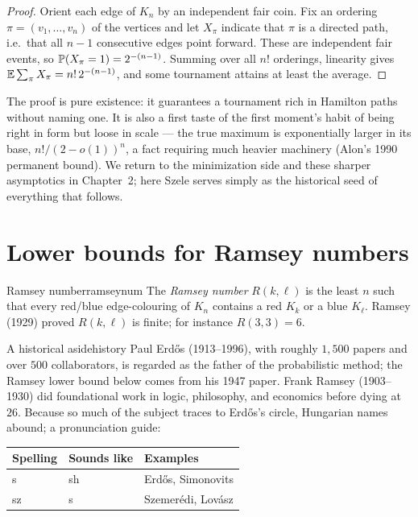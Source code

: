 \begin{proof}
Orient each edge of $K_n$ by an independent fair coin. Fix an ordering
$\pi=(v_1,\dots,v_n)$ of the vertices and let $X_\pi$ indicate that $\pi$ is a
directed path, i.e.\ that all $n-1$ consecutive edges point forward. These are
independent fair events, so $\mathbb{P}(X_\pi=1)=2^{-(n-1)}$. Summing over all $n!$
orderings, linearity gives $\mathbb{E}\sum_\pi X_\pi=n!\,2^{-(n-1)}$, and some
tournament attains at least the average.
\end{proof}

\begin{insight}
The proof is pure existence: it guarantees a tournament rich in Hamilton paths
without naming one. It is also a first taste of the first moment's habit of
being right in form but loose in scale --- the true maximum is exponentially
larger in its base, $n!/(2-o(1))^n$, a fact requiring much heavier machinery
(Alon's 1990 permanent bound). We return to the minimization side and these
sharper asymptotics in Chapter~2; here Szele serves simply as the historical
seed of everything that follows.
\end{insight}

\section{Lower bounds for Ramsey numbers}

\begin{definition}{Ramsey number}{ramseynum}
The \emph{Ramsey number} $R(k,\ell)$ is the least $n$ such that every red/blue
edge-colouring of $K_n$ contains a red $K_k$ or a blue $K_\ell$. Ramsey (1929)
proved $R(k,\ell)$ is finite; for instance $R(3,3)=6$.
\end{definition}

\begin{remark}{A historical aside}{history}
Paul Erd\H{o}s (1913--1996), with roughly $1{,}500$ papers and over $500$
collaborators, is regarded as the father of the probabilistic method; the
Ramsey lower bound below comes from his 1947 paper. Frank Ramsey (1903--1930)
did foundational work in logic, philosophy, and economics before dying at
$26$. Because so much of the subject traces to Erd\H{o}s's circle, Hungarian
names abound; a pronunciation guide:
\begin{center}\small
\begin{tabular}{lll}
\toprule
\textbf{Spelling} & \textbf{Sounds like} & \textbf{Examples}\\
\midrule
s  & sh & Erd\H{o}s, Simonovits\\
sz & s  & Szemer\'edi, Lov\'asz\\
\bottomrule
\end{tabular}
\end{center}
\end{remark}

